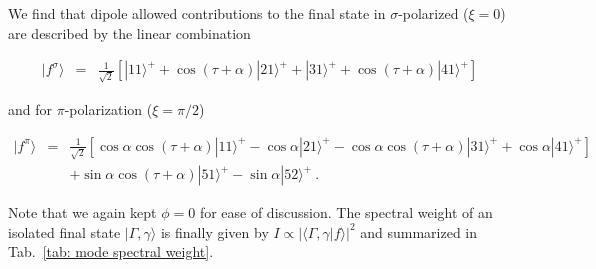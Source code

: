 \documentclass[twocolumn,prb,twocolumn,amsmath,superscriptaddress,nofootinbib,amssymb]{revtex4-1}
\begin{document}
\begin{widetext}
We find that dipole allowed contributions to the final state in $\sigma$-polarized ($\xi=0$) are described by the linear combination

\begin{eqnarray}
|f^\sigma\rangle&=&\frac{1}{\sqrt{2}}\left[ |11\rangle^++\cos(\tau+\alpha) |21\rangle^+ + |31\rangle^+ +\cos(\tau+\alpha) |41\rangle^+\right]\nonumber
\end{eqnarray}

\noindent and for $\pi$-polarization ($\xi=\pi/2$)

\begin{eqnarray}
|f^\pi\rangle&=&\frac{1}{\sqrt{2}}\left[ \cos\alpha\cos(\tau+\alpha) |11\rangle^+- \cos\alpha |21\rangle^+ - \cos\alpha\cos(\tau+\alpha)|31\rangle^+ + \cos\alpha |41\rangle^+\right]\nonumber\\
&&+\sin\alpha\cos(\tau+\alpha)|51\rangle^+- \sin\alpha |52\rangle^+\nonumber~.
\end{eqnarray}

Note that we again kept $\phi=0$ for ease of discussion. The spectral weight of an isolated final state $|\Gamma,\gamma\rangle$ is finally given by $I\propto |\langle \Gamma,\gamma|f\rangle|^2$ and summarized in Tab.~\ref{tab: mode spectral weight}.

\begin{table*}[htbp]
\caption{\label{tab: mode spectral weight} Spectral weight of the final states as a function of scattering angle $\tau$ and the incoming light direction $\alpha$ starting from a $A_{1g}$ groundstate.}
\end{table*}


\end{widetext}
\end{document}
